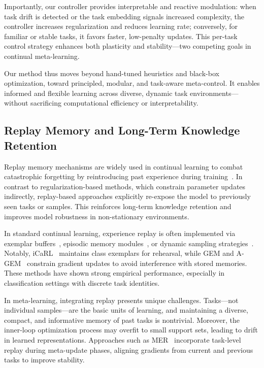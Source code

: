 \documentclass[conference]{IEEEtran}
\begin{document}
Importantly, our controller provides interpretable and reactive modulation: when task drift is detected or the task embedding signals increased complexity, the controller increases regularization and reduces learning rate; conversely, for familiar or stable tasks, it favors faster, low-penalty updates. This per-task control strategy enhances both plasticity and stability—two competing goals in continual meta-learning.

Our method thus moves beyond hand-tuned heuristics and black-box optimization, toward principled, modular, and task-aware meta-control. It enables informed and flexible learning across diverse, dynamic task environments—without sacrificing computational efficiency or interpretability.

\subsection{Replay Memory and Long-Term Knowledge Retention}

Replay memory mechanisms are widely used in continual learning to combat catastrophic forgetting by reintroducing past experience during training~\cite{rolnick2019experience}. In contrast to regularization-based methods, which constrain parameter updates indirectly, replay-based approaches explicitly re-expose the model to previously seen tasks or samples. This reinforces long-term knowledge retention and improves model robustness in non-stationary environments.

In standard continual learning, experience replay is often implemented via exemplar buffers~\cite{rebuffi2017icarl}, episodic memory modules~\cite{lopez2017gradient}, or dynamic sampling strategies~\cite{riemer2019learning}. Notably, iCaRL~\cite{rebuffi2017icarl} maintains class exemplars for rehearsal, while GEM and A-GEM~\cite{lopez2017gradient, chaudhry2018efficient} constrain gradient updates to avoid interference with stored memories. These methods have shown strong empirical performance, especially in classification settings with discrete task identities.

In meta-learning, integrating replay presents unique challenges. Tasks—not individual samples—are the basic units of learning, and maintaining a diverse, compact, and informative memory of past tasks is nontrivial. Moreover, the inner-loop optimization process may overfit to small support sets, leading to drift in learned representations. Approaches such as MER~\cite{riemer2019learning} incorporate task-level replay during meta-update phases, aligning gradients from current and previous tasks to improve stability.
\end{document}
